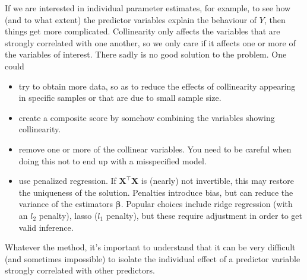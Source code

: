 \documentclass[
  11pt,
  letterpaper,
]{scrbook}
\providecommand{\tightlist}{%
  \setlength{\itemsep}{0pt}\setlength{\parskip}{0pt}}\usepackage{longtable,booktabs,array}
\theoremstyle{definition}
\theoremstyle{definition}
\theoremstyle{plain}
\theoremstyle{plain}
\theoremstyle{remark}
\begin{document}
If we are interested in individual parameter estimates, for example, to
see how (and to what extent) the predictor variables explain the
behaviour of \(Y\), then things get more complicated. Collinearity only
affects the variables that are strongly correlated with one another, so
we only care if it affects one or more of the variables of interest.
There sadly is no good solution to the problem. One could

\begin{itemize}
\tightlist
\item
  try to obtain more data, so as to reduce the effects of collinearity
  appearing in specific samples or that are due to small sample size.
\item
  create a composite score by somehow combining the variables showing
  collinearity.
\item
  remove one or more of the collinear variables. You need to be careful
  when doing this not to end up with a misspecified model.
\item
  use penalized regression. If \(\mathbf{X}^\top\mathbf{X}\) is (nearly)
  not invertible, this may restore the uniqueness of the solution.
  Penalties introduce bias, but can reduce the variance of the
  estimators \(\boldsymbol{\beta}\). Popular choices include ridge
  regression (with an \(l_2\) penalty), lasso (\(l_1\) penalty), but
  these require adjustment in order to get valid inference.
\end{itemize}

Whatever the method, it's important to understand that it can be very
difficult (and sometimes impossible) to isolate the individual effect of
a predictor variable strongly correlated with other predictors.
\end{document}
